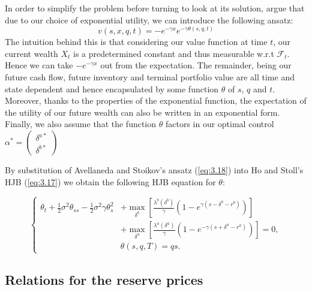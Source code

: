 In order to simplify the problem before turning to look at its solution, 
\cite{AS2008} argue that due to our choice of exponential 
utility, we can introduce the following ansatz:
\begin{equation}\label{eq:3.18}
    v(s,x,q,t)=-e^{-\gamma x}e^{-\gamma\theta(s,q,t)}
\end{equation}
The intuition behind this is that considering our value function at 
time $t$, our current wealth $X_t$ is a predetermined constant and thus
measurable w.r.t $\mathcal{F}_t$. Hence we can take $-e^{-\gamma x}$
out from the expectation. The remainder, being our future cash flow, 
future inventory and terminal portfolio value are all time and state
dependent and hence encapsulated by some function $\theta$ of $s$, $q$
and $t$. Moreover, thanks to the properties of the exponential function, 
the expectation of the utility of our future wealth can also be 
written in an exponential form. Finally, we also assume that the function
$\theta$ factors in our optimal control $\alpha^*=\begin{pmatrix}\delta^{a*}\\\delta^{b*}\end{pmatrix}$

By substitution of Avellaneda and Stoikov's ansatz (\ref{eq:3.18}) into 
Ho and Stoll's HJB (\ref{eq:3.17}) we obtain the following HJB equation
for $\theta$:
\begin{theorem}\label{thm:3.7.2}
    \begin{equation}\label{eq:3.19}
        \left\{
            \begin{aligned}
                \theta_t+\frac{1}{2}\sigma^2\theta_{ss}-\frac{1}{2}\sigma^2\gamma\theta_{s}^2&+\max\limits_{\delta^b}\left[\frac{\lambda^b(\delta^b)}{\gamma}(1-e^{\gamma(s-\delta^b-r^b)})\right]\\
                &+\max\limits_{\delta^a}\left[\frac{\lambda^a(\delta^a)}{\gamma}(1-e^{-\gamma(s+\delta^a-r^a)})\right]=0,\\
                &\theta(s,q,T)=qs.
            \end{aligned}
        \right.
    \end{equation}
\end{theorem}

\subsection*{Relations for the reserve prices}

